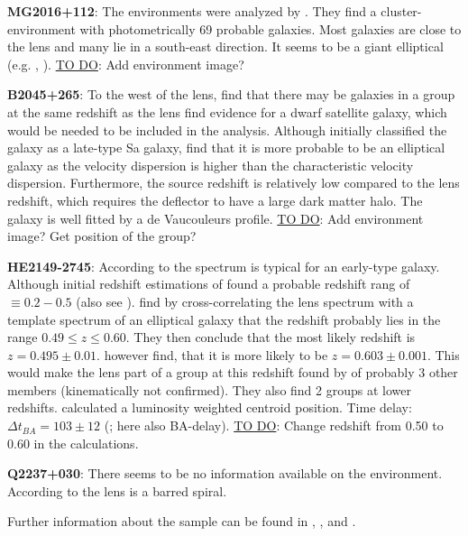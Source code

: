 \documentclass[10pt]{article}
\begin{document}
\textbf{MG2016+112}: The environments were analyzed by \cite{2003MNRAS.344..337T}. They find a cluster-environment with photometrically 69 probable galaxies. Most galaxies are close to the lens and many lie in a south-east direction. It seems to be a giant elliptical (e.g. \cite{1984Sci...223...46L}, \cite{1986AJ.....91..991S}). \underline{TO DO}: Add environment image?

\textbf{B2045+265}: To the west of the lens, \cite{1999AJ....117..658F} find that there may be galaxies in a group at the same redshift as the lens \cite{2007MNRAS.378..109M} find evidence for a dwarf satellite galaxy, which would be needed to be included in the analysis. Although \cite{1999AJ....117..658F} initially classified the galaxy as a late-type Sa galaxy, \cite{2007MNRAS.378..109M} find that it is more probable to be an elliptical galaxy as the velocity dispersion is higher than the characteristic velocity dispersion. Furthermore, the source redshift is relatively low compared to the lens redshift, which requires the deflector to have a large dark matter halo. The galaxy is well fitted by a de Vaucouleurs profile. \underline{TO DO}: Add environment image? Get position of the group?

\textbf{HE2149-2745}: According to \cite{2007A&A...465...51E} the spectrum is typical for an early-type galaxy. Although initial redshift estimations of \cite{1996A&A...315L.405W} found a probable redshift rang of $\equiv0.2-0.5$ (also see \cite{2000ApJ...543..131K}). \cite{2002A&A...383...71B} find by cross-correlating the lens spectrum with a template spectrum of an elliptical galaxy that the redshift probably lies in the range $0.49\leq z \leq 0.60$. They then conclude that the most likely redshift is $z=0.495\pm0.01$. \cite{2007A&A...465...51E} however find, that it is more likely to be $z=0.603\pm0.001$. This would make the lens part of a group at this redshift found by \cite{2006ApJ...641..169M} of probably 3 other members (kinematically not confirmed). They also find 2 groups at lower redshifts. \cite{2006ApJ...646...85W} calculated a luminosity weighted centroid position. Time delay: $\Delta t_{BA}=103\pm12$ (\cite{2002A&A...383...71B}; here also BA-delay). \underline{TO DO}: Change redshift from 0.50 to 0.60 in the calculations.

\textbf{Q2237+030}: There seems to be no information available on the environment. According to \cite{1988AJ.....95.1331Y} the lens is a barred spiral.

Further information about the sample can be found in \cite{leier11phd}, \cite{2011ApJ...740...97L}, and \cite{2012A&A...538A..99S}.
\end{document}
